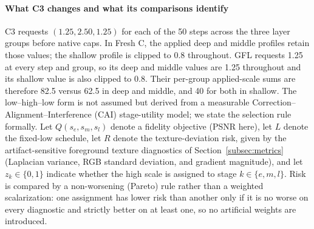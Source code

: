 \documentclass[times,twocolumn,final]{elsarticle}
\providecommand{\DIFadd}[1]{{\protect\color{blue} \sf #1}} %
\providecommand{\DIFdel}[1]{{\protect\color{red} \scriptsize #1}} %
\providecommand{\DIFaddbegin}{} %
\providecommand{\DIFaddend}{} %
\providecommand{\DIFdelbegin}{} %
\providecommand{\DIFdelend}{} %
\begin{document}
\DIFdelbegin %
\DIFdelend \DIFaddbegin \paragraph{What C3 changes and what its comparisons identify}
\DIFadd{C3 requests $(1.25,2.50,1.25)$ for each of the 50 steps across the three layer groups before native caps. In Fresh C, the applied deep and middle profiles retain those values; the shallow profile is clipped to 0.8 throughout. GFL requests 1.25 at every step and group, so its deep and middle values are 1.25 throughout and its shallow value is also clipped to 0.8. Their per-group applied-scale sums are therefore 82.5 versus 62.5 in deep and middle, and 40 for both in shallow. }\DIFaddend The \DIFdelbegin \DIFdel{low--high--low form is not assumed but derived from a measurable Correction--Alignment--Interference (CAI) stage-utility model; we state the selection rule formally. Let $Q(s_e,s_m,s_l)$ denote a fidelity objective (PSNR here), let $L$ denote the fixed-low schedule, let $R$ denote the texture-deviation risk, given by the artifact-sensitive foreground texture diagnostics of Section~\ref{subsec:metrics} (Laplacian variance, RGB standard deviation, and gradient magnitude), and let $z_k\in\{0,1\}$ indicate whether the high scale is assigned to stage $k\in\{e,m,l\}$. Risk is compared by a non-worsening (Pareto) rule rather than a weighted scalarization: one assignment has lower risk than another only if it is no worse on every diagnostic and strictly better on at least one, so no artificial weights are introduced.
}%
\end{document}
